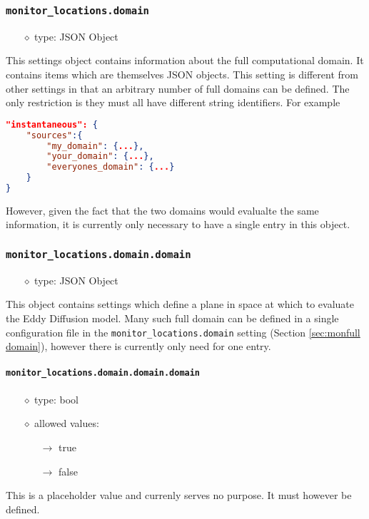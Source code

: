 \documentclass[]{article}
\def\code#1{\texttt{#1}}
\begin{document}
\subsubsection{\code{monitor\_locations.domain}}\label{sec:mondomain}
\begin{itemize}
    \item[$\diamond$] type: JSON Object 
\end{itemize}
This settings object contains information about the full computational domain.
It contains items which are themselves JSON objects. This setting is different
from other settings in that an arbitrary number of full domains can be defined.
The only restriction is they must all have different string identifiers. For
example\\
\begin{lstlisting}[language=json,firstnumber=1]
"instantaneous": {
    "sources":{
        "my_domain": {...},
        "your_domain": {...},
        "everyones_domain": {...}
    }
}
\end{lstlisting}
However, given the fact that the two domains would evalualte the same
information, it is currently only necessary to have a single entry in this
object.


\subsubsection{\code{monitor\_locations.domain.domain}}
\begin{itemize}
    \item[$\diamond$] type: JSON Object 
\end{itemize}
This object contains settings which define a plane in space at which to evaluate
the Eddy Diffusion model. Many such full domain can be defined in a single
configuration file in the \code{monitor\_locations.domain} setting (Section
\ref{sec:monfull domain}), however there is currently only need for one entry.


\paragraph{\code{monitor\_locations.domain.domain.domain}}
\begin{itemize}
    \item[$\diamond$] type: bool 
    \item[$\diamond$] allowed values:
    \begin{itemize}
        \item[$\rightarrow$] true
        \item[$\rightarrow$] false
    \end{itemize}
\end{itemize}
This is a placeholder value and currenly serves no purpose. It must however be
defined.
\end{document}
